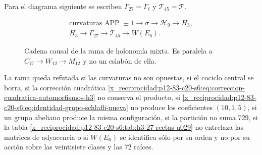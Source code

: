 Para el diagrama siguiente se escriben
\(\Gamma_{27}=\Gamma_\ell\) y \(\mathcal T_{45}=\mathcal T\).
\begin{figure}[htbp]
\centering
\[
 \begin{gathered}
 \text{curvaturas APP }\pm1
 \longrightarrow\sigma
 \longrightarrow\mathcal H_9
 \longrightarrow H_3,\\[3pt]
 H_3
 \longrightarrow\Gamma_{27}
 \longrightarrow\mathcal T_{45}
 \longrightarrow W(E_6).
 \end{gathered}
\]
\caption{Cadena causal de la rama de holonomía mixta. Es paralela a
\(C_W\to W_{12}\to M_{12}\) y no un eslabón de ella.}
\label{x_reciprocidad:p12-83-c20-s6:fig:cadena-holonomia-e6-u029}
\end{figure}

\begin{criterion}
\label{x_reciprocidad:p12-83-c20-s6:crit:refutacion-rama-e6-u029}
La rama queda refutada si las curvaturas no son opuestas, si el cociclo
central se borra, si la corrección cuadrática
\eqref{x_reciprocidad:p12-83-c20-s6:eq:correccion-cuadratica-automorfismos-h3} no conserva el producto,
si \eqref{x_reciprocidad:p12-83-c20-s6:eq:identidad-grupo-schlafli-nueva} no produce los coeficientes
\((10,1,5)\), si un grupo abeliano produce la misma configuración, si la
partición no suma 729, si la tabla
\ref{x_reciprocidad:p12-83-c20-s6:tab:h3-27-rectas-u029} no entrelaza las matrices de adyacencia o si
\(W(E_6)\) se identifica sólo por su orden y no por su acción sobre las
veintisiete clases y las 72 raíces.
\end{criterion}
